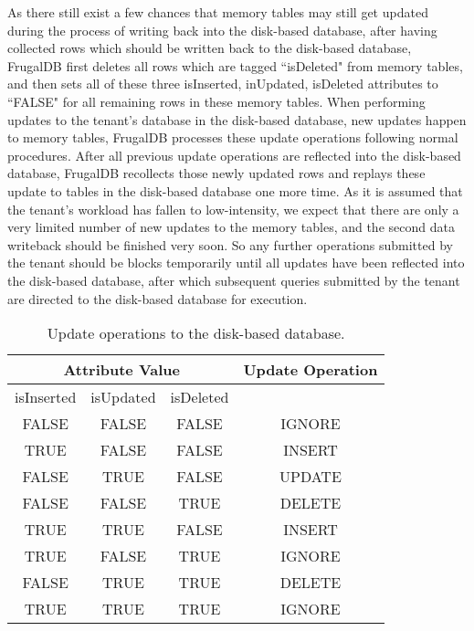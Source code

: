 As there still exist a few chances that memory tables may still get updated during the process of writing back into the disk-based database, after having collected rows which should be written back to the disk-based database, FrugalDB first deletes all rows which are tagged ``isDeleted" from memory tables, and then sets all of these three isInserted, inUpdated, isDeleted attributes to ``FALSE" for all remaining rows in these memory tables. When performing updates to the tenant's database in the disk-based database, new updates happen to memory tables, FrugalDB processes these update operations following normal procedures. After all previous update operations are reflected into the disk-based database, FrugalDB recollects those newly updated rows and replays these update to tables in the disk-based database one more time. As it is assumed that the tenant's workload has fallen to low-intensity, we expect that there are only a very limited number of new updates to the memory tables, and the second data writeback should be finished very soon. So any further operations submitted by the tenant should be blocks temporarily until all updates have been reflected into the disk-based database, after which subsequent queries submitted by the tenant are directed to the disk-based database for execution.

\begin{table}[!htb]
\caption{Update operations to the disk-based database.}
\label{table:update-operations}
\centering
\begin{tabular}{|c|c|c|c|}
\hline
\multicolumn{3}{|c|}{Attribute Value} &  Update Operation\\
\hline
isInserted  & isUpdated & isDeleted & \\
\hline
FALSE & FALSE & FALSE & IGNORE\\
\hline
TRUE  & FALSE & FALSE & INSERT\\
\hline
FALSE  & TRUE & FALSE & UPDATE\\
\hline
FALSE  & FALSE & TRUE & DELETE\\
\hline
TRUE  & TRUE & FALSE & INSERT\\
\hline
TRUE  & FALSE & TRUE & IGNORE\\
\hline
FALSE  & TRUE & TRUE & DELETE\\
\hline
TRUE  & TRUE & TRUE & IGNORE\\
\hline
\end{tabular}
\end{table}
